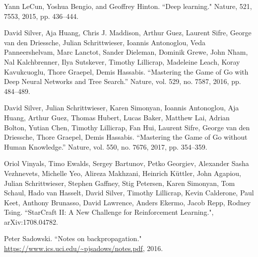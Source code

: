 \documentclass[a4paper, 10pt, notitlepage, twocolumn]{article}
\begin{document}
\begin{thebibliography}{XX}

Yann LeCun, Yoshua Bengio, and Geoffrey Hinton. ``Deep learning." Nature, 521, 7553, 2015, pp. 436–444.

 David Silver, Aja Huang, Chris J. Maddison, Arthur Guez, Laurent Sifre, George van den Driessche, Julian Schrittwieser, Ioannis Antonoglou, Veda Panneershelvam, Marc Lanctot, Sander Dieleman, Dominik Grewe, John Nham, Nal Kalchbrenner, Ilya Sutskever, Timothy Lillicrap, Madeleine Leach, Koray Kavukcuoglu, Thore Graepel, Demis Hassabis. “Mastering the Game of Go with Deep Neural Networks and Tree Search.” Nature, vol. 529, no. 7587, 2016, pp. 484–489.
 
 David Silver, Julian Schrittwieser, Karen Simonyan, Ioannis Antonoglou, Aja Huang, Arthur Guez, Thomas Hubert, Lucas Baker, Matthew Lai, Adrian Bolton, Yutian Chen, Timothy Lillicrap, Fan Hui, Laurent Sifre, George van den Driessche, Thore Graepel, Demis Hassabis. “Mastering the Game of Go without Human Knowledge.” Nature, vol. 550, no. 7676, 2017, pp. 354–359. 
 
Oriol Vinyals, Timo Ewalds, Sergey Bartunov, Petko Georgiev, Alexander Sasha Vezhnevets, Michelle Yeo, Alireza Makhzani, Heinrich Küttler, John Agapiou, Julian Schrittwieser, Stephen Gaffney, Stig Petersen, Karen Simonyan, Tom Schaul, Hado van Hasselt, David Silver, Timothy Lillicrap, Kevin Calderone, Paul Keet, Anthony Brunasso, David Lawrence, Anders Ekermo, Jacob Repp, Rodney Tsing. ``StarCraft II: A New Challenge for
Reinforcement Learning.", arXiv:1708.04782.

Peter Sadowski. ``Notes on backpropagation." \url{https://www.ics.uci.edu/~pjsadows/notes.pdf}, 2016.

\end{thebibliography}

\newpage

 
\end{document}
